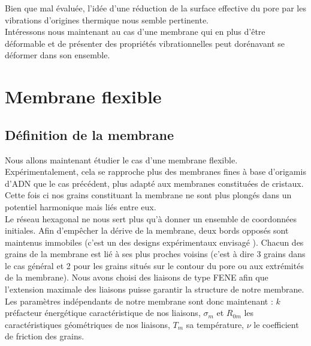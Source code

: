 Bien que mal évaluée, l'idée d'une réduction de la surface effective du pore par les vibrations d'origines thermique nous semble pertinente.\\

Intéressons nous maintenant au cas d'une membrane qui en plus d'être déformable et de présenter des propriétés vibrationnelles peut dorénavant se déformer dans son ensemble.





\newpage




\section{Membrane flexible}
\subsection{Définition de la membrane}
\label{chapitrememflex}

Nous allons maintenant étudier le cas d'une membrane flexible. Expérimentalement, cela se rapproche plus des membranes fines à base d'origamis d'ADN \cite{2Bell2012,HernndezAinsa2013} que le cas précédent, plus adapté aux membranes constituées de cristaux. Cette fois ci nos grains constituant la membrane ne sont plus plongés dans un potentiel harmonique mais liés entre eux.\\

Le réseau hexagonal ne nous sert plus qu'à donner un ensemble de coordonnées initiales. Afin d'empêcher la dérive de la membrane, deux bords opposés sont maintenus immobiles (c'est un des designs expérimentaux envisagé \cite{Saha2012}). Chacun des grains de la membrane est lié à ses plus proches voisins (c'est à dire 3 grains dans le cas général et 2 pour les grains situés sur le contour du pore ou aux extrémités de la membrane). Nous avons choisi des liaisons de type FENE afin que l'extension maximale des liaisons puisse garantir la structure de notre membrane. Les paramètres indépendants de notre membrane sont donc maintenant : $k$ préfacteur énergétique caractéristique de nos liaisons, $\sigma_m$ et $R_{0m}$ les caractéristiques géométriques de nos liaisons, $T_m$ sa température, $\nu$ le coefficient de friction des grains. 

